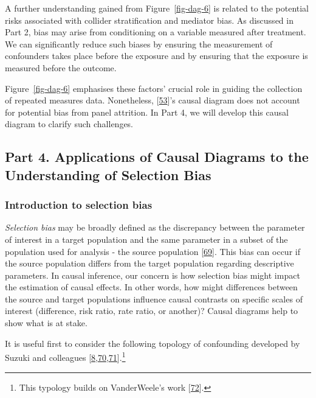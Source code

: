 \documentclass[
  singlecolumn]{article}
\begin{document}
A further understanding gained from Figure~\ref{fig-dag-6} is related to
the potential risks associated with collider stratification and mediator
bias. As discussed in Part 2, bias may arise from conditioning on a
variable measured after treatment. We can significantly reduce such
biases by ensuring the measurement of confounders takes place before the
exposure and by ensuring that the exposure is measured before the
outcome.

Figure~\ref{fig-dag-6} emphasises these factors' crucial role in guiding
the collection of repeated measures data. Nonetheless,
{[}\protect\hyperlink{ref-vanderweele2020}{53}{]}'s causal diagram does
not account for potential bias from panel attrition. In Part 4, we will
develop this causal diagram to clarify such challenges.

\hypertarget{part-4.-applications-of-causal-diagrams-to-the-understanding-of-selection-bias}{%
\subsection{Part 4. Applications of Causal Diagrams to the Understanding
of Selection
Bias}\label{part-4.-applications-of-causal-diagrams-to-the-understanding-of-selection-bias}}

\hypertarget{introduction-to-selection-bias}{%
\subsubsection{Introduction to selection
bias}\label{introduction-to-selection-bias}}

\emph{Selection bias} may be broadly defined as the discrepancy between
the parameter of interest in a target population and the same parameter
in a subset of the population used for analysis - the source population
{[}\protect\hyperlink{ref-hernuxe1n2017}{69}{]}. This bias can occur if
the source population differs from the target population regarding
descriptive parameters. In causal inference, our concern is how
selection bias might impact the estimation of causal effects. In other
words, how might differences between the source and target populations
influence causal contrasts on specific scales of interest (difference,
risk ratio, rate ratio, or another)? Causal diagrams help to show what
is at stake.

It is useful first to consider the following topology of confounding
developed by Suzuki and colleagues
{[}\protect\hyperlink{ref-suzuki2020}{8},\protect\hyperlink{ref-suzuki2016}{70},\protect\hyperlink{ref-suzuki2014}{71}{]}.\footnote{This
  typology builds on VanderWeele's work
  {[}\protect\hyperlink{ref-vanderweele2012}{72}{]}.}
\end{document}
